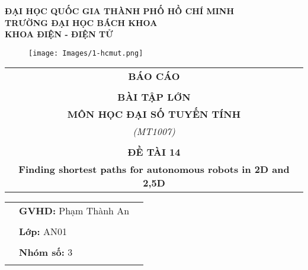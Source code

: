 \documentclass[a4paper]{article}
\theoremstyle{definition}
\begin{document}
\begin{titlepage}

\begin{center}
\LARGE \textbf{ĐẠI HỌC QUỐC GIA THÀNH PHỐ HỒ CHÍ MINH} \\
\vspace{0.2cm}
\LARGE \textbf{TRƯỜNG ĐẠI HỌC BÁCH KHOA} \\
\vspace{0.2cm}
\LARGE \textbf{KHOA ĐIỆN - ĐIỆN TỬ}
\end{center}

\vspace{0.3cm}

\begin{figure}[h!]
\begin{center}
\texttt{[image: Images/1-hcmut.png]}
\end{center}
\end{figure}

\begin{center}
\begin{tabular}{c}
\multicolumn{1}{c}{\textbf{{\LARGE BÁO CÁO}}}\\
\\{\textbf{{\LARGE BÀI TẬP LỚN}}}
\\{\textbf{{\LARGE MÔN HỌC ĐẠI SỐ TUYẾN TÍNH}}}
\\ \textit{(MT1007)}
\\
\\
\textbf{\LARGE ĐỀ TÀI 14}\\
\textbf{\Large Finding shortest paths for autonomous robots in 2D and 2,5D }

\end{tabular}
\end{center}
\vspace{0.5cm}
\begin{table}[h]
\begin{tabular}{rll}
\hspace{2 cm} &  \textbf{\Large GVHD:} {\Large Phạm Thành An}
\\
\\
\hspace{2 cm} &   \textbf{\Large Lớp:} {\Large AN01}
\\
\\
\hspace{2 cm}  &   \textbf{\Large Nhóm số:} {\Large 3}
\\
\\
\end{tabular}
\end{table}


\end{titlepage}
\end{document}
